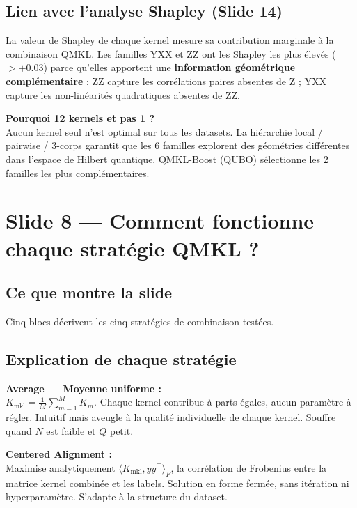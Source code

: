 \documentclass[12pt, a4paper]{article}
\begin{document}
\subsection*{Lien avec l'analyse Shapley (Slide 14)}

La valeur de Shapley de chaque kernel mesure sa contribution marginale à la combinaison QMKL.
Les familles YXX et ZZ ont les Shapley les plus élevés ($>+0.03$) parce qu'elles apportent
une \textbf{information géométrique complémentaire} : ZZ capture les corrélations paires
absentes de Z ; YXX capture les non-linéarités quadratiques absentes de ZZ.

\begin{retenir}
\textbf{Pourquoi 12 kernels et pas 1 ?}\\
Aucun kernel seul n'est optimal sur tous les datasets.
La hiérarchie local / pairwise / 3-corps garantit que les 6 familles explorent
des géométries différentes dans l'espace de Hilbert quantique.
QMKL-Boost (QUBO) sélectionne les 2 familles les plus complémentaires.
\end{retenir}

\section{Slide 8 — Comment fonctionne chaque stratégie QMKL ?}

\subsection*{Ce que montre la slide}

Cinq blocs décrivent les cinq stratégies de combinaison testées.

\subsection*{Explication de chaque stratégie}

\textbf{Average — Moyenne uniforme :}\\
$K_{\text{mkl}} = \frac{1}{M}\sum_{m=1}^{M} K_m$.
Chaque kernel contribue à parts égales, aucun paramètre à régler.
Intuitif mais aveugle à la qualité individuelle de chaque kernel.
Souffre quand $N$ est faible et $Q$ petit.

\textbf{Centered Alignment :}\\
Maximise analytiquement $\langle K_{\text{mkl}}, yy^\top \rangle_F$,
la corrélation de Frobenius entre la matrice kernel combinée et les labels.
Solution en forme fermée, sans itération ni hyperparamètre.
S'adapte à la structure du dataset.
\end{document}
